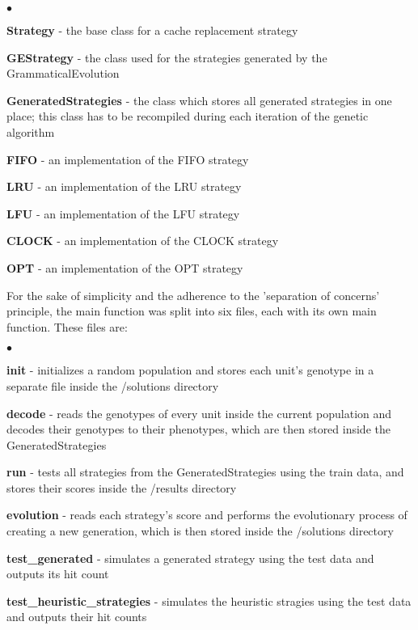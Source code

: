 \begin{list}{$\bullet$}{}  	
	\item \textbf{Strategy} - the base class for a cache replacement strategy
	\item \textbf{GEStrategy} - the class used for the strategies generated by the GrammaticalEvolution
	\item \textbf{GeneratedStrategies} - the class which stores all generated strategies in one place; this class has to be recompiled during each iteration of the genetic algorithm
	\item \textbf{FIFO} - an implementation of the FIFO strategy
	\item \textbf{LRU} - an implementation of the LRU strategy
	\item \textbf{LFU} - an implementation of the LFU strategy
	\item \textbf{CLOCK} - an implementation of the CLOCK strategy
	\item \textbf{OPT} - an implementation of the OPT strategy
\end{list}

For the sake of simplicity and the adherence to the 'separation of concerns' principle, the main function was split into six files, each with its own main function. These files are:

\begin{list}{$\bullet$}{}  	
	\item \textbf{init} - initializes a random population and stores each unit's genotype in a separate file inside the /solutions directory
	\item \textbf{decode} - reads the genotypes of every unit inside the current population and decodes their genotypes to their phenotypes, which are then stored inside the GeneratedStrategies
	\item \textbf{run} - tests all strategies from the GeneratedStrategies using the train data, and stores their scores inside the /results directory
	\item \textbf{evolution} - reads each strategy's score and performs the evolutionary process of creating a new generation, which is then stored inside the /solutions directory
	\item \textbf{test\_generated} - simulates a generated strategy using the test data and outputs its hit count
	\item \textbf{test\_heuristic\_strategies} - simulates the heuristic stragies using the test data and outputs their hit counts
\end{list}

